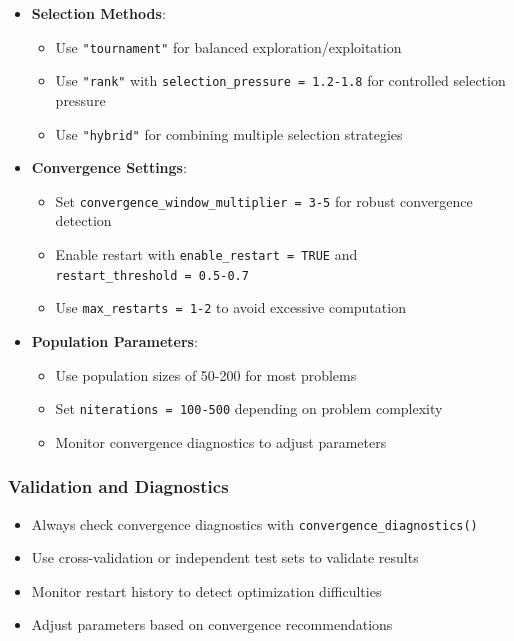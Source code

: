 \documentclass[
]{article}
\providecommand{\tightlist}{%
  \setlength{\itemsep}{0pt}\setlength{\parskip}{0pt}}
\begin{document}
\begin{itemize}
\tightlist
\item
  \textbf{Selection Methods}:

  \begin{itemize}
  \tightlist
  \item
    Use \texttt{"tournament"} for balanced exploration/exploitation
  \item
    Use \texttt{"rank"} with \texttt{selection\_pressure\ =\ 1.2-1.8}
    for controlled selection pressure
  \item
    Use \texttt{"hybrid"} for combining multiple selection strategies
  \end{itemize}
\item
  \textbf{Convergence Settings}:

  \begin{itemize}
  \tightlist
  \item
    Set \texttt{convergence\_window\_multiplier\ =\ 3-5} for robust
    convergence detection
  \item
    Enable restart with \texttt{enable\_restart\ =\ TRUE} and
    \texttt{restart\_threshold\ =\ 0.5-0.7}
  \item
    Use \texttt{max\_restarts\ =\ 1-2} to avoid excessive computation
  \end{itemize}
\item
  \textbf{Population Parameters}:

  \begin{itemize}
  \tightlist
  \item
    Use population sizes of 50-200 for most problems
  \item
    Set \texttt{niterations\ =\ 100-500} depending on problem complexity
  \item
    Monitor convergence diagnostics to adjust parameters
  \end{itemize}
\end{itemize}

\subsubsection{Validation and
Diagnostics}\label{validation-and-diagnostics}

\begin{itemize}
\tightlist
\item
  Always check convergence diagnostics with
  \texttt{convergence\_diagnostics()}
\item
  Use cross-validation or independent test sets to validate results
\item
  Monitor restart history to detect optimization difficulties
\item
  Adjust parameters based on convergence recommendations
\end{itemize}
\end{document}
